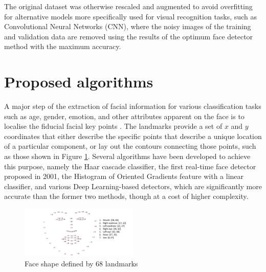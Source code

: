 \documentclass[conference]{IEEEtran}
\begin{document}
The original dataset was otherwise rescaled and augmented to avoid overfitting for alternative models more specifically used for visual recognition tasks, such as Convolutional Neural Networks (CNN), where the noisy images of the training and validation data are removed using the results of the optimum face detector method with the maximum accuracy. %

\section{Proposed algorithms} \label{s-algorithms}


A major step of the extraction of facial information for various classification tasks such as age, gender, emotion, and other attributes apparent on the face is to localise the fiducial facial key points \cite{landmark_lit}. The landmarks provide a set of $x$ and $y$ coordinates that either describe the specific points that describe a unique location of a particular component, or lay out the contours connecting those points, such as those shown in Figure \ref{fig: landmarks}.
Several algorithms have been developed to achieve this purpose, namely the Haar cascade classifier, the first real-time face detector proposed in 2001, the Histogram of Oriented Gradients feature with a linear classifier, and various Deep Learning-based detectors, which are significantly more accurate than the former two methods, though at a cost of higher complexity.

\begin{figure} [h] %
  \centering
    \includegraphics[width=0.5\textwidth]{graphs/landmarks} 
    \caption{Face shape defined by 68 landmarks}
    \label{fig: landmarks}
\end{figure}
\end{document}
